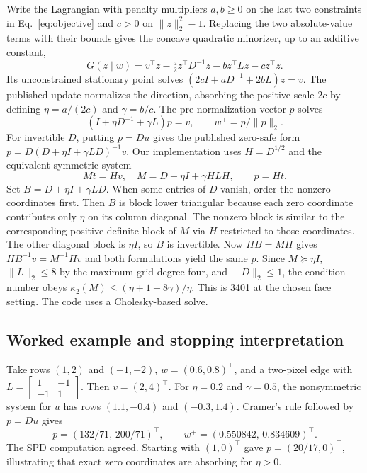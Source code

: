 Write the Lagrangian with penalty multipliers $a,b\ge0$ on the last two constraints in Eq.~\eqref{eq:objective} and $c>0$ on $\|z\|_2^2-1$. Replacing the two absolute-value terms with their bounds gives the concave quadratic minorizer, up to an additive constant,
\[
 G(z\mid w) = v^\top z -\tfrac a2 z^\top D^{-1}z -b z^\top Lz-c z^\top z.
\]
Its unconstrained stationary point solves $(2cI+aD^{-1}+2bL)z=v$. The published update normalizes the direction, absorbing the positive scale $2c$ by defining $\eta=a/(2c)$ and $\gamma=b/c$. The pre-normalization vector $p$ solves
\begin{equation}
 (I+\eta D^{-1}+\gamma L)p=v,\qquad
 w^+=p/\|p\|_2 .
 \label{eq:original}
\end{equation}
For invertible $D$, putting $p=Du$ gives the published zero-safe form $p=D(D+\eta I+\gamma LD)^{-1}v$. Our implementation uses $H=D^{1/2}$ and the equivalent symmetric system
\begin{equation}
 M t=Hv,\quad M=D+\eta I+\gamma H L H,\qquad
 p=Ht .
 \label{eq:spd}
\end{equation}
Set $B=D+\eta I+\gamma LD$. When some entries of $D$ vanish, order the nonzero coordinates first. Then $B$ is block lower triangular because each zero coordinate contributes only $\eta$ on its column diagonal. The nonzero block is similar to the corresponding positive-definite block of $M$ via $H$ restricted to those coordinates. The other diagonal block is $\eta I$, so $B$ is invertible. Now $HB=MH$ gives $HB^{-1}v=M^{-1}Hv$ and both formulations yield the same $p$. Since $M\succeq\eta I$, $\|L\|_2\le8$ by the maximum grid degree four, and $\|D\|_2\le1$, the condition number obeys $\kappa_2(M)\le(\eta+1+8\gamma)/\eta$. This is 3401 at the chosen face setting. The code uses a Cholesky-based solve.

\subsection{Worked example and stopping interpretation}

Take rows $(1,2)$ and $(-1,-2)$, $w=(0.6,0.8)^\top$, and a two-pixel edge with $L=\left[\begin{smallmatrix}1&-1\\-1&1\end{smallmatrix}\right]$. Then $v=(2,4)^\top$. For $\eta=0.2$ and $\gamma=0.5$, the nonsymmetric system for $u$ has rows $(1.1,-0.4)$ and $(-0.3,1.4)$. Cramer's rule followed by $p=Du$ gives
\[
 p=(132/71,\,200/71)^\top,\qquad w^+=(0.550842,\,0.834609)^\top.
\]
The SPD computation agreed. Starting with $(1,0)^\top$ gave $p=(20/17,0)^\top$, illustrating that exact zero coordinates are absorbing for $\eta>0$.


